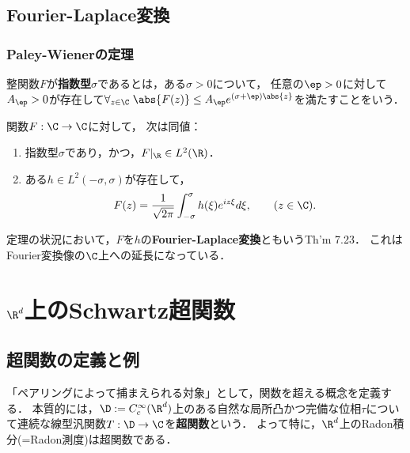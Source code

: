 \documentclass[uplatex,dvipdfmx]{jsreport}
\begin{document}
\section{Fourier-Laplace変換}

\subsection{Paley-Wienerの定理}

\begin{definition}
    整関数$F$が\textbf{指数型$\sigma$}であるとは，ある$\sigma>0$について，
    任意の$\ep>0$に対して$A_\ep>0$が存在して$\forall_{z\in\C}\;\abs{F(z)}\le A_\ep e^{(\sigma+\ep)\abs{z}}$を満たすことをいう．
\end{definition}

\begin{theorem}
    関数$F:\C\to\C$に対して，
    次は同値：
    \begin{enumerate}
        \item 指数型$\sigma$であり，かつ，$F|_{\R}\in L^2(\R)$．
        \item ある$h\in L^2(-\sigma,\sigma)$が存在して，
        \[F(z)=\frac{1}{\sqrt{2\pi}}\int^\sigma_{-\sigma}h(\xi)e^{iz\xi}d\xi,\qquad(z\in\C).\]
    \end{enumerate}
\end{theorem}

\begin{definition}
    定理の状況において，$F$を$h$の\textbf{Fourier-Laplace変換}ともいう\cite{Rudin-FunctionalAnalysis}Th'm 7.23．
    これはFourier変換像の$\C$上への延長になっている．
\end{definition}

\chapter{$\R^d$上のSchwartz超関数}



\section{超関数の定義と例}

\begin{tcolorbox}[colframe=ForestGreen, colback=ForestGreen!10!white,breakable,colbacktitle=ForestGreen!40!white,coltitle=black,fonttitle=\bfseries\sffamily,
title=]
    「ペアリングによって捕まえられる対象」として，関数を超える概念を定義する．
    本質的には，$\D:=C_c^\infty(\R^d)$上のある自然な局所凸かつ完備な位相$\tau$について連続な線型汎関数$T:\D\to\C$を\textbf{超関数}という．
    よって特に，$\R^d$上のRadon積分(=Radon測度)は超関数である．
\end{tcolorbox}
\end{document}
